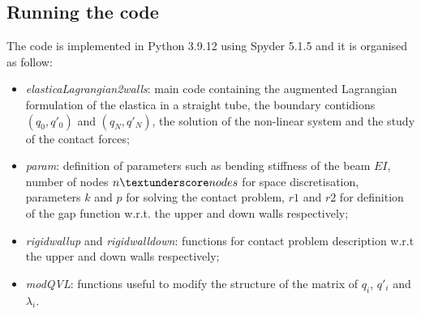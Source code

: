 \subsection{Running the code}

The code is implemented in Python 3.9.12 using Spyder 5.1.5 and it is organised as follow: \begin{itemize}
	\item \textit{elastica\textunderscore Lagrangian\textunderscore 2walls}: main code containing the augmented Lagrangian formulation of the elastica in a straight tube, the boundary contidions $(q_0,q'_0)$ and $(q_N, q'_N)$, the solution of the non-linear system and the study of the contact forces;
	\item \textit{param}: definition of parameters such as bending stiffness of the beam $EI$, number of nodes $n\textunderscore nodes$ for space discretisation, parameters $k$ and $p$ for solving the contact problem, $r1$ and $r2$ for definition of the gap function w.r.t. the upper and down walls respectively;
	\item \textit{rigid\textunderscore wall\textunderscore up} and \textit{rigid\textunderscore wall\textunderscore down}: functions for contact problem description w.r.t the upper and down walls respectively;
	\item \textit{mod\textunderscore QVL}: functions useful to modify the structure of the matrix of $q_i$, $q'_i$ and $\lambda_i$.  
\end{itemize}




